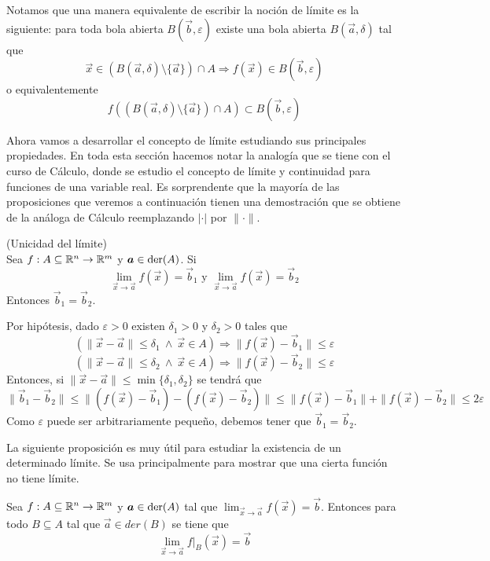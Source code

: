 \begin{nota} Notamos que una manera equivalente de escribir la noci\'on 
de l\'imite es la siguiente:  para toda bola abierta $B(\vec{b},\varepsilon)$ 
existe una bola abierta $B(\vec{a},\delta)$ tal que
$$\vec{x}\in (B(\vec{a},\delta)\setminus \{\vec{a}\})\cap A\Rightarrow f(\vec{x})\in B(\vec{b},\varepsilon)$$
o equivalentemente
$$f((B(\vec{a},\delta)\setminus \{\vec{a}\})\cap A)\subset  B(\vec{b},\varepsilon)$$
\end{nota}

Ahora vamos a desarrollar el concepto de l\'imite estudiando sus principales
propiedades. En toda esta secci\'on hacemos notar la analog\'ia que se tiene
con el curso de C\'alculo, donde se estudio el concepto de l\'imite y
continuidad para funciones de una variable real. Es sorprendente que la mayor\'ia de las proposiciones que veremos a continuaci\'on tienen una demostraci\'on que
se obtiene de la an\'aloga de C\'alculo reemplazando $|\cdot|$ por $\|\cdot\|$.

\begin{proposicion}{\rm (Unicidad del l\'imite)} 
\\Sea $f:A\subseteq \mathbb{R}^n\to\mathbb{R}^m$ y 
$\boldsymbol{a}\in \text{der}({A})$. Si 
$$\lim_{\vec{x}\to \vec{a}}f(\vec{x})=\vec{b}_1 \text{ y } \lim_{\vec{x}\to \vec{a}}f(\vec{x})=\vec{b}_2$$
Entonces $\vec{b}_1 = \vec{b}_2$.
\end{proposicion}

\begin{demostracion}
Por hip\'otesis, dado $\varepsilon>0$ existen $\delta_1>0$ y
$\delta_2>0$ tales que
$$(\|\vec{x}-\vec{a}\|\leq \delta_1 \:\wedge \: \vec{x}\in A)\Rightarrow \|f(\vec{x})-\vec{b}_1\|\leq \varepsilon$$
$$(\|\vec{x}-\vec{a}\|\leq \delta_2 \:\wedge \: \vec{x}\in A)\Rightarrow \|f(\vec{x})-\vec{b}_2\|\leq \varepsilon$$
Entonces, si $\|\vec{x}-\vec{a}\|\leq \min\{\delta_1,\delta_2\}$ se tendr\'a que
$$\|\vec{b}_1-\vec{b}_2\|\leq \|(f(\vec{x})-\vec{b}_1)-(f(\vec{x})-\vec{b}_2)\|\leq \|f(\vec{x})-\vec{b}_1\|+\|f(\vec{x})-\vec{b}_2\| \leq 2\varepsilon$$
Como $\varepsilon$ puede ser arbitrariamente peque\~no, debemos tener que $\vec{b}_1=\vec{b}_2$.
\end{demostracion}

La siguiente proposici\'on es muy \'util para estudiar la existencia de
un determinado l\'imite. Se usa principalmente para mostrar que una cierta funci\'on no tiene l\'imite.

\begin{proposicion} 
Sea $f:A\subseteq\mathbb{R}^n\to \mathbb{R}^m$ y $\boldsymbol{a}\in \text{der}({A})$ tal que $\displaystyle \lim_{\vec{x}\to \vec{a}}f(\vec{x})=\vec{b}$. Entonces para todo $B\subseteq A$ tal que $\vec{a}\in der(B)$ se tiene que
$$\lim_{\vec{x}\to \vec{a}}f|_B(\vec{x})=\vec{b}$$
\end{proposicion}

